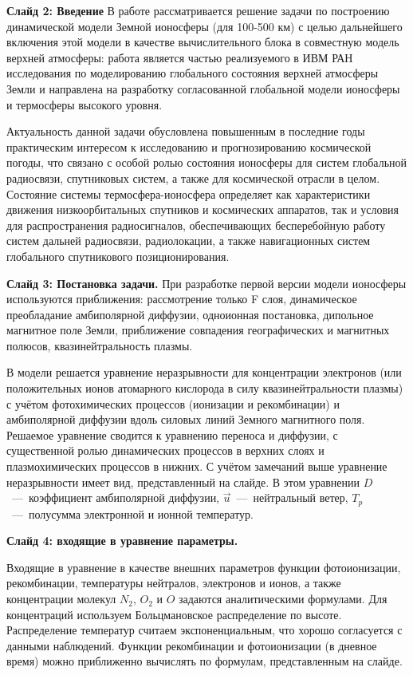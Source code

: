 \documentclass[2pt, a4paper, fleqn]{extarticle}
\begin{document}
{\bf Слайд 2: Введение}
В работе рассматривается решение задачи по построению динамической модели Земной ионосферы (для 100-500 км) с целью дальнейшего включения этой модели в качестве вычислительного блока в совместную модель верхней атмосферы: работа является частью реализуемого в ИВМ РАН исследования по моделированию глобального состояния верхней атмосферы Земли и направлена на разработку согласованной глобальной модели ионосферы и термосферы высокого уровня. 

Актуальность данной задачи обусловлена повышенным в последние годы практическим интересом к исследованию и прогнозированию космической погоды, что связано с особой ролью состояния ионосферы для систем глобальной радиосвязи, спутниковых систем, а также для космической отрасли в целом. Состояние системы термосфера-ионосфера определяет как характеристики движения низкоорбитальных спутников и космических аппаратов, так и условия для распространения радиосигналов, обеспечивающих бесперебойную работу систем дальней радиосвязи, радиолокации, а также навигационных систем глобального спутникового позиционирования. 

\medskip

{\bf Слайд 3: Постановка задачи.}
При разработке первой версии модели ионосферы используются приближения: рассмотрение только F слоя, динамическое преобладание амбиполярной диффузии, одноионная постановка, дипольное магнитное поле Земли, приближение совпадения географических и магнитных полюсов, квазинейтральность плазмы.

В модели решается уравнение неразрывности для концентрации электронов (или положительных ионов атомарного кислорода в силу квазинейтральности плазмы) с учётом фотохимических процессов (ионизации и рекомбинации) и амбиполярной диффузии вдоль силовых линий Земного магнитного поля. Решаемое уравнение сводится к уравнению переноса и диффузии, с существенной ролью динамических процессов в верхних слоях и плазмохимических процессов в нижних. С учётом замечаний выше уравнение неразрывности имеет вид, представленный на слайде. В этом уравнении $D$~---~коэффициент амбиполярной диффузии, $\vec{u}$~---~нейтральный ветер, $T_p$~---~полусумма электронной и ионной температур.

\medskip

{\bf Слайд 4: входящие в уравнение параметры.}

Входящие в уравнение в качестве внешних параметров функции фотоионизации, рекомбинации, температуры нейтралов, электронов и ионов, а также концентрации молекул $N_2$, $O_2$ и $O$ задаются аналитическими формулами. Для концентраций используем Больцмановское распределение по высоте. Распределение температур считаем экспоненциальным, что хорошо согласуется с данными наблюдений. 
Функции рекомбинации и фотоионизации (в дневное время) можно приближенно вычислять по формулам, представленным на слайде.
\end{document}
